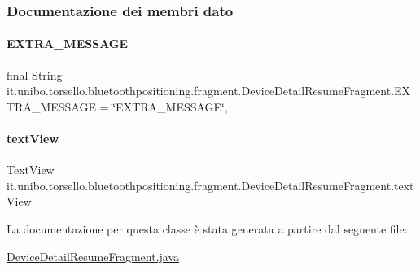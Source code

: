 \subsubsection{Documentazione dei membri dato}
\hypertarget{classit_1_1unibo_1_1torsello_1_1bluetoothpositioning_1_1fragment_1_1DeviceDetailResumeFragment_a26b6bb100efe8bbb74e10fbd8deca47f_a26b6bb100efe8bbb74e10fbd8deca47f}{}\label{classit_1_1unibo_1_1torsello_1_1bluetoothpositioning_1_1fragment_1_1DeviceDetailResumeFragment_a26b6bb100efe8bbb74e10fbd8deca47f_a26b6bb100efe8bbb74e10fbd8deca47f} 
\paragraph{\texorpdfstring{E\+X\+T\+R\+A\+\_\+\+M\+E\+S\+S\+A\+GE}{EXTRA\_MESSAGE}}
{\footnotesize\ttfamily final String it.\+unibo.\+torsello.\+bluetoothpositioning.\+fragment.\+Device\+Detail\+Resume\+Fragment.\+E\+X\+T\+R\+A\+\_\+\+M\+E\+S\+S\+A\+GE = \char`\"{}E\+X\+T\+R\+A\+\_\+\+M\+E\+S\+S\+A\+GE\char`\"{}\hspace{0.3cm}{\ttfamily [static]}, {\ttfamily [private]}}

\hypertarget{classit_1_1unibo_1_1torsello_1_1bluetoothpositioning_1_1fragment_1_1DeviceDetailResumeFragment_a0ce36645eb31d9ab981a9dfeef206ada_a0ce36645eb31d9ab981a9dfeef206ada}{}\label{classit_1_1unibo_1_1torsello_1_1bluetoothpositioning_1_1fragment_1_1DeviceDetailResumeFragment_a0ce36645eb31d9ab981a9dfeef206ada_a0ce36645eb31d9ab981a9dfeef206ada} 
\paragraph{\texorpdfstring{text\+View}{textView}}
{\footnotesize\ttfamily Text\+View it.\+unibo.\+torsello.\+bluetoothpositioning.\+fragment.\+Device\+Detail\+Resume\+Fragment.\+text\+View\hspace{0.3cm}{\ttfamily [private]}}



La documentazione per questa classe è stata generata a partire dal seguente file\+:\begin{DoxyCompactItemize}
\item 
\hyperlink{DeviceDetailResumeFragment_8java}{Device\+Detail\+Resume\+Fragment.\+java}\end{DoxyCompactItemize}

